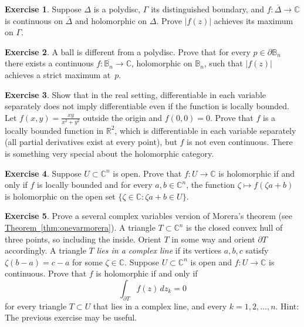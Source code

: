 \documentclass[12pt,openany]{book}
\newcommand{\sabs}[1]{\lvert {#1} \rvert}
\newcommand{\C}{{\mathbb{C}}}
\newcommand{\R}{{\mathbb{R}}}
\newcommand{\bB}{{\mathbb{B}}}
\theoremstyle{plain}
\theoremstyle{remark}
\theoremstyle{definition}
\newenvironment{exbox}{%
    \def\FrameCommand{\vrule width 1pt \relax\hspace{10pt}}%
    \MakeFramed{\advance\hsize-\width\FrameRestore}%
}{%
    \endMakeFramed
}
\theoremstyle{exercise}
\newtheorem{exercise}{Exercise}[section]
\theoremstyle{example}
\newcommand{\thmref}[1]{\hyperref[#1]{Theorem~\ref*{#1}}}
\begin{document}
\begin{exbox}
\begin{exercise}
Suppose $\Delta$ is a polydisc, $\Gamma$ its distinguished boundary,
and $f \colon \overline{\Delta} \to \C$ is continuous on $\overline{\Delta}$
and holomorphic on $\Delta$.
Prove
$\sabs{f(z)}$ achieves its maximum on $\Gamma$.
\end{exercise}

\begin{exercise}
A ball is different from a polydisc.  Prove that for every $p \in \partial \bB_n$
there exists a continuous $f \colon \overline{\bB_n} \to \C$, holomorphic
on $\bB_n$, such that $\sabs{f(z)}$ achieves a strict maximum at~$p$.
\end{exercise}

\begin{exercise}
Show that in the real setting, differentiable
in each variable separately does not imply differentiable even if
the function is locally bounded.
Let $f(x,y) = \frac{xy}{x^2+y^2}$ outside the origin
and $f(0,0) = 0$.  Prove that $f$ is a
locally bounded function in $\R^2$, which is differentiable
in each variable separately (all partial derivatives exist at every point),
but $f$ is not even continuous.  There is something very
special about the holomorphic category.
\end{exercise}

\begin{exercise}
Suppose $U \subset \C^n$ is open.
Prove that $f \colon U \to \C$ is holomorphic if and only if
$f$ is locally bounded and
for every $a,b \in \C^n$, the
function
$\zeta \mapsto f(\zeta a + b)$ is holomorphic on
the open set $\{ \zeta \in \C : \zeta a + b \in U \}$.
\end{exercise}

\begin{exercise}
Prove a several complex variables version of Morera's theorem (see
\thmref{thm:onevarmorera}).
A triangle $T \subset \C^n$ is the closed convex hull of three points, so
including the inside.  Orient $T$ in some way %
and orient $\partial T$ accordingly.
A triangle $T$ \emph{lies in a complex line} if
its vertices $a,b,c$ satisfy
$\zeta (b-a) = c-a$ for some $\zeta \in \C$.
Suppose $U \subset \C^n$ is open and $f \colon U \to \C$ is continuous.
Prove that $f$ is holomorphic if and only if
\begin{equation*}
\int_{\partial T} f(z) \, dz_k = 0
\end{equation*}
for every triangle $T \subset U$ that lies in a complex line,
and every $k=1,2,\ldots,n$.
Hint: The previous exercise may be useful.
\end{exercise}


\end{exbox}
\end{document}
